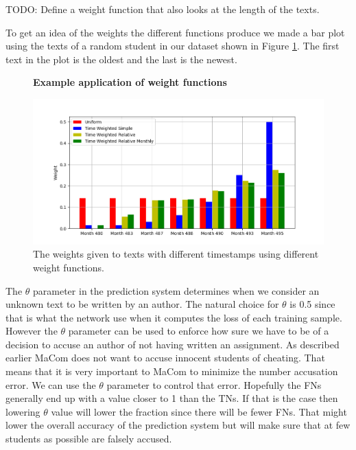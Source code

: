 TODO: Define a weight function that also looks at the length of the texts.

To get an idea of the weights the different functions produce we made a bar
plot using the texts of a random student in our dataset shown in Figure
\ref{fig:weights_bar}. The first text in the plot is the oldest and the last is
the newest.

\begin{figure}
    \centering
    \textbf{Example application of weight functions}\par\medskip
    \includegraphics[width=\textwidth]{./pictures/method/weight_bar.png}
    \caption{The weights given to texts with different timestamps using
        different weight functions.}
    \label{fig:weights_bar}
\end{figure}

The $\theta$ parameter in the prediction system determines when we consider an
unknown text to be written by an author. The natural choice for $\theta$ is 0.5
since that is what the network use when it computes the loss of each training
sample. However the $\theta$ parameter can be used to enforce how sure we have
to be of a decision to accuse an author of not having written an assignment. As
described earlier MaCom does not want to accuse innocent students of cheating.
That means that it is very important to MaCom to minimize the number accusation
error. We can use the $\theta$ parameter to control that error. Hopefully the
\gls{FN}s generally end up with a value closer to 1 than the \gls{TN}s. If that
is the case then lowering $\theta$ value will lower the fraction since there
will be fewer \gls{FN}s. That might lower the overall accuracy of the prediction
system but will make sure that at few students as possible are falsely accused.
